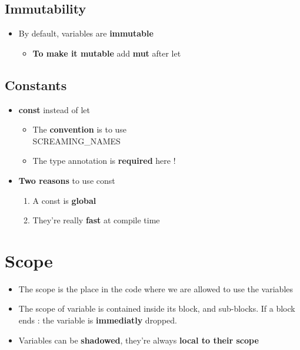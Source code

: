 \documentclass{report}
\begin{document}
\begin{multicols*}{2}
\subsection{Immutability}

\begin{itemize}
	\item By default, variables are \textbf{immutable} 
		\begin{itemize}
			\item \textbf{To make it mutable} add \textbf{mut} after let
		\end{itemize}
\end{itemize}

\subsection{Constants}

\begin{itemize}
	\item \textbf{const} instead of let
		\begin{itemize}
			\item The \textbf{convention} is to use\\ 
        SCREAMING\_NAMES 
			\item The type annotation is \textbf{required} here !
		\end{itemize}
	\item \textbf{Two reasons} to use const
		\begin{enumerate}
			\item A const is \textbf{global}  
			\item They're really \textbf{fast} at compile time
		\end{enumerate}
\end{itemize}


\section{Scope}

\begin{itemize}
	\item The scope is the place in the code where we are allowed to use the variables 
	\item The scope of variable is contained inside its block, and sub-blocks. If a block ends : the variable is \textbf{immediatly} dropped. 
	\item Variables can be \textbf{shadowed}, they're always \textbf{local to their scope}  
\end{itemize}


\end{multicols*}
\end{document}
